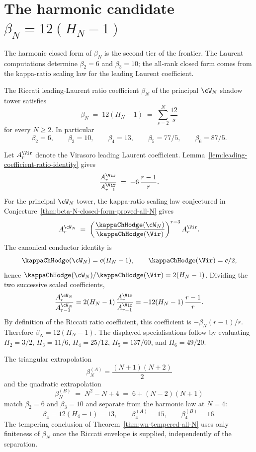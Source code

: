 \section{The harmonic candidate $\beta_N = 12(H_N - 1)$}
\label{sec:beta-N-closed-form}

The harmonic closed form of $\beta_N$ is the second tier of the
frontier. The Laurent computations determine $\beta_2=6$ and
$\beta_3=10$; the all-rank closed form comes from the kappa-ratio
scaling law for the leading Laurent coefficient.

\begin{conjecture}
\label{prop:beta-N-closed-form}
\ClaimStatusConjectured
The Riccati leading-Laurent ratio coefficient $\beta_N$ of the
principal $\cW_N$ shadow tower satisfies
\[
 \beta_N \;=\; 12(H_N - 1)
 \;=\; \sum_{s=2}^{N} \frac{12}{s}
\]
for every $N \ge 2$. In particular
\[
 \beta_2 = 6,\qquad
 \beta_3 = 10,\qquad
 \beta_4 = 13,\qquad
 \beta_5 = 77/5,\qquad
 \beta_6 = 87/5.
\]
\end{conjecture}

\begin{remark}
Let $A_r^{\Vir}$ denote the Virasoro leading Laurent coefficient.
Lemma~\ref{lem:leading-coefficient-ratio-identity} gives
\[
 \frac{A_r^{\Vir}}{A_{r-1}^{\Vir}}
 \;=\; -6\,\frac{r-1}{r}.
\]
For the principal $\cW_N$ tower, the kappa-ratio scaling law conjectured in
Conjecture~\ref{thm:beta-N-closed-form-proved-all-N} gives
\[
 A_r^{\cW_N}
 \;=\;
 \left(\frac{\kappaChHodge(\cW_N)}{\kappaChHodge(\Vir)}\right)^{r-3}
 A_r^{\Vir}.
\]
The canonical conductor identity is
\[
 \kappaChHodge(\cW_N)=c(H_N-1),\qquad \kappaChHodge(\Vir)=c/2,
\]
hence $\kappaChHodge(\cW_N)/\kappaChHodge(\Vir)=2(H_N-1)$. Dividing the two
successive scaled coefficients,
\[
 \frac{A_r^{\cW_N}}{A_{r-1}^{\cW_N}}
 =
 2(H_N-1)\,\frac{A_r^{\Vir}}{A_{r-1}^{\Vir}}
 =
 -12(H_N-1)\,\frac{r-1}{r}.
\]
By definition of the Riccati ratio coefficient, this coefficient is
$-\beta_N(r-1)/r$. Therefore $\beta_N=12(H_N-1)$. The displayed
specialisations follow by evaluating
$H_2=3/2$, $H_3=11/6$, $H_4=25/12$, $H_5=137/60$, and $H_6=49/20$.
\end{remark}

\begin{remark}[Polynomial candidates separated at $N = 4$]
\label{rem:beta-candidate-discriminator}
The triangular extrapolation
\[
 \beta_N^{(A)}=\frac{(N+1)(N+2)}{2}
\]
and the quadratic extrapolation
\[
 \beta_N^{(B)} \;=\; N^2 - N + 4 \;=\; 6 + (N-2)(N+1)
\]
match $\beta_2=6$ and $\beta_3=10$ and separate from the harmonic law
at $N=4$:
\[
 \beta_4 = 12(H_4-1)=13,
 \qquad
 \beta_4^{(A)}=15,
 \qquad
 \beta_4^{(B)}=16.
\]
The tempering conclusion of
Theorem~\ref{thm:wn-tempered-all-N} uses only finiteness of $\beta_N$
once the Riccati envelope is supplied, independently of the
separation.
\end{remark}

